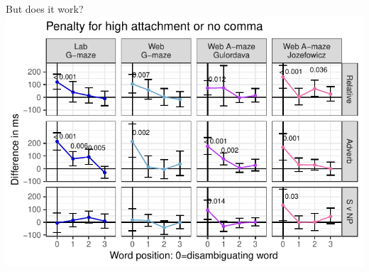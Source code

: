 \documentclass[12pt, xcolor=beamer,table,dvipsnames, ignorenonframetext, ngerman]{beamer}
\begin{document}
\begin{frame}{But does it work?}
\includegraphics[width=.95\textwidth]{a_all.pdf}
\end{frame}
%
%
%
%
%
%
\end{document}
